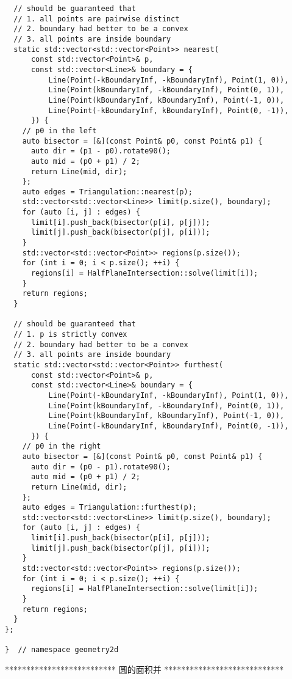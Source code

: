 \documentclass{article}
\begin{document}
\begin{multicols}{2}
\begin{lstlisting}
  // should be guaranteed that
  // 1. all points are pairwise distinct
  // 2. boundary had better to be a convex
  // 3. all points are inside boundary
  static std::vector<std::vector<Point>> nearest(
      const std::vector<Point>& p,
      const std::vector<Line>& boundary = {
          Line(Point(-kBoundaryInf, -kBoundaryInf), Point(1, 0)),
          Line(Point(kBoundaryInf, -kBoundaryInf), Point(0, 1)),
          Line(Point(kBoundaryInf, kBoundaryInf), Point(-1, 0)),
          Line(Point(-kBoundaryInf, kBoundaryInf), Point(0, -1)),
      }) {
    // p0 in the left
    auto bisector = [&](const Point& p0, const Point& p1) {
      auto dir = (p1 - p0).rotate90();
      auto mid = (p0 + p1) / 2;
      return Line(mid, dir);
    };
    auto edges = Triangulation::nearest(p);
    std::vector<std::vector<Line>> limit(p.size(), boundary);
    for (auto [i, j] : edges) {
      limit[i].push_back(bisector(p[i], p[j]));
      limit[j].push_back(bisector(p[j], p[i]));
    }
    std::vector<std::vector<Point>> regions(p.size());
    for (int i = 0; i < p.size(); ++i) {
      regions[i] = HalfPlaneIntersection::solve(limit[i]);
    }
    return regions;
  }

  // should be guaranteed that
  // 1. p is strictly convex
  // 2. boundary had better to be a convex
  // 3. all points are inside boundary
  static std::vector<std::vector<Point>> furthest(
      const std::vector<Point>& p,
      const std::vector<Line>& boundary = {
          Line(Point(-kBoundaryInf, -kBoundaryInf), Point(1, 0)),
          Line(Point(kBoundaryInf, -kBoundaryInf), Point(0, 1)),
          Line(Point(kBoundaryInf, kBoundaryInf), Point(-1, 0)),
          Line(Point(-kBoundaryInf, kBoundaryInf), Point(0, -1)),
      }) {
    // p0 in the right
    auto bisector = [&](const Point& p0, const Point& p1) {
      auto dir = (p0 - p1).rotate90();
      auto mid = (p0 + p1) / 2;
      return Line(mid, dir);
    };
    auto edges = Triangulation::furthest(p);
    std::vector<std::vector<Line>> limit(p.size(), boundary);
    for (auto [i, j] : edges) {
      limit[i].push_back(bisector(p[i], p[j]));
      limit[j].push_back(bisector(p[j], p[i]));
    }
    std::vector<std::vector<Point>> regions(p.size());
    for (int i = 0; i < p.size(); ++i) {
      regions[i] = HalfPlaneIntersection::solve(limit[i]);
    }
    return regions;
  }
};

}  // namespace geometry2d

  \end{lstlisting}

  ************************** 圆的面积并 ****************************


\end{multicols}
\end{document}
